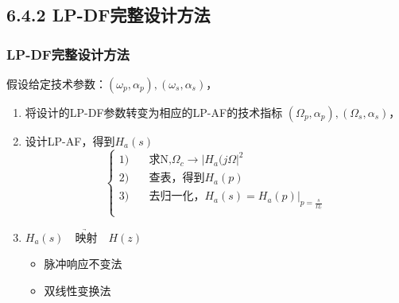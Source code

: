 \documentclass[notheorems,compress,mathserif,table]{beamer}
\begin{document}
\subsection{6.4.2 LP-DF完整设计方法}
\begin{frame}[shrink]\frametitle{LP-DF完整设计方法}%
假设给定技术参数：$(\omega_p,\alpha_p),(\omega_s,\alpha_s)$，
\begin{enumerate}
  \item
      将设计的LP-DF参数转变为相应的LP-AF的技术指标
      $(\Omega_p,\alpha_p),(\Omega_s,\alpha_s)$，
  \item
      设计LP-AF，得到$H_a(s)$
      $$
      \left\{ \begin{aligned}
        1) &\quad \mbox{求N,$\Omega_c\rightarrow|H_a(j\Omega|^2$}\\
        2) &\quad \mbox{查表，得到$H_a(p)$}\\
        3) &\quad \mbox{去归一化，$H_a(s)= H_a(p)|_{p=\frac{s}{\Omega_c}}$}\\
      \end{aligned} \right.
      $$
  \item
      $H_a(s)\underrightarrow{\quad\mbox{映射}\quad}H(z)$
      \begin{itemize}
        \item 脉冲响应不变法
        \item 双线性变换法
      \end{itemize}
\end{enumerate}
\end{frame}
\end{document}
